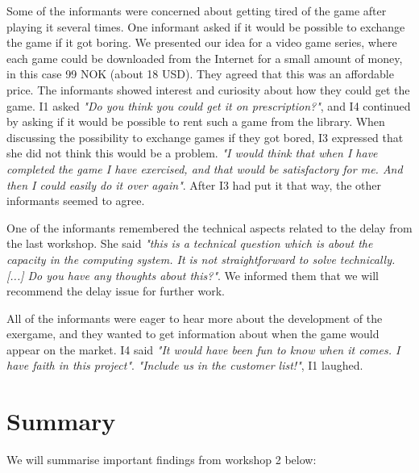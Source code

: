 Some of the informants were concerned about getting tired of the game after playing it several times. One informant asked if it would be possible to exchange the game if it got boring. We presented our idea for a video game series, where each game could be downloaded from the Internet for a small amount of money, in this case 99 NOK (about 18 USD). They agreed that this was an affordable price. The informants showed interest and curiosity about how they could get the game. I1 asked \emph{"Do you think you could get it on prescription?"}, and I4 continued by asking if it would be possible to rent such a game from the library. When discussing the possibility to exchange games if they got bored, I3 expressed that she did not think this would be a problem. \emph{"I would think that when I have completed the game I have exercised, and that would be satisfactory for me. And then I could easily do it over again"}. After I3 had put it that way, the other informants seemed to agree.

One of the informants remembered the technical aspects related to the delay from the last workshop. She said \emph{"this is a technical question which is about the capacity in the computing system. It is not straightforward to solve technically. [...] Do you have any thoughts about this?"}. We informed them that we will recommend the delay issue for further work.

All of the informants were eager to hear more about the development of the exergame, and they wanted to get information about when the game would appear on the market. I4 said \emph{"It would have been fun to know when it comes. I have faith in this project"}. \emph{"Include us in the customer list!"}, I1 laughed.

\section{Summary}

We will summarise important findings from workshop 2 below:

